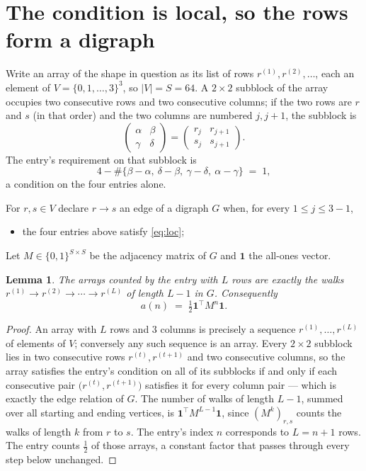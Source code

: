 \documentclass[11pt,a4paper]{article}
\theoremstyle{plain}
\newtheorem{lemma}[theorem]{Lemma}
\theoremstyle{definition}
\begin{document}
\section{The condition is local, so the rows form a digraph}

Write an array of the shape in question as its list of rows
$r^{(1)},r^{(2)},\dots$, each an element of
$V=\{0,1,\dots,3\}^{3}$, so $|V|=S=64$. A $2\times2$ subblock of the array
occupies two consecutive rows and two consecutive columns; if the two rows are $r$
and $s$ (in that order) and the two columns are numbered $j,j+1$,
the subblock is
\[
\begin{pmatrix}\alpha&\beta\\\gamma&\delta\end{pmatrix}=\begin{pmatrix}r_j&r_{j+1}\\s_j&s_{j+1}\end{pmatrix}.
\]
The entry's requirement on that subblock is
\begin{equation}\label{eq:loc}
4-\#\{\beta-\alpha,\ \delta-\beta,\ \gamma-\delta,\ \alpha-\gamma\}\;=\;1,
\end{equation}
a condition on the four entries alone.

For $r,s\in V$ declare $r\to s$ an edge of a digraph $G$ when, for every
$1\le j\le 3-1$,
\begin{itemize}
\item the four entries above satisfy \eqref{eq:loc};

\end{itemize}
Let $M\in\{0,1\}^{S\times S}$ be the adjacency matrix of $G$ and $\mathbf{1}$ the
all-ones vector.

\begin{lemma}\label{lem:walk}
The arrays counted by the entry with $L$ rows are exactly the walks
$r^{(1)}\to r^{(2)}\to\cdots\to r^{(L)}$ of length $L-1$ in $G$. Consequently
\[
a(n)\;=\;\tfrac1{2}\mathbf{1}^{\!\top}M^{n}\mathbf{1} .
\]
\end{lemma}

\begin{proof}
An array with $L$ rows and $3$ columns is precisely a sequence
$r^{(1)},\dots,r^{(L)}$ of elements of $V$; conversely any such sequence is an array.
Every $2\times2$ subblock lies in two consecutive rows $r^{(t)},r^{(t+1)}$ and two
consecutive columns, so the array satisfies the entry's condition on all of its subblocks
if and only if each consecutive pair $\bigl(r^{(t)},r^{(t+1)}\bigr)$ satisfies it for
every column pair --- which is exactly the edge relation of $G$. The number of walks of
length $L-1$, summed over all starting and ending vertices, is
$\mathbf{1}^{\!\top}M^{L-1}\mathbf{1}$, since $(M^{k})_{r,s}$ counts the walks of
length $k$ from $r$ to $s$. The entry's index $n$ corresponds to $L=n+1$ rows. The entry counts $\tfrac1{2}$ of those arrays, a constant factor that passes through every step below unchanged.
\end{proof}
\end{document}

